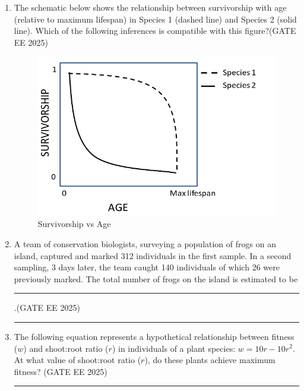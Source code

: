 \begin{enumerate}[leftmargin=*,label=\textbf{Q.\arabic*},resume]
\item The schematic below shows the relationship between survivorship with age (relative to maximum lifespan) in Species 1 (dashed line) and Species 2 (solid line). Which of the following inferences is compatible with this figure?\hfill {(GATE EE 2025)}

\begin{figure}[H]
    \centering
    \includegraphics[width=0.9\columnwidth]{figs/imageQ52.png}
    \caption{Survivorship vs Age}
    \label{fig:q52-scbematic}
\end{figure}



\item A team of conservation biologists, surveying a population of frogs on an island, captured and marked 312 individuals in the first sample. In a second sampling, 3 days later, the team caught 140 individuals of which 26 were previously marked. The total number of frogs on the island is estimated to be \rule{4cm}{0.15mm}.\hfill {(GATE EE 2025)}

\rule{4cm}{0.15mm}

\item The following equation represents a hypothetical relationship between fitness ($w$) and shoot:root ratio ($r$) in individuals of a plant species: $w = 10r-10r^2$. At what value of shoot:root ratio ($r$), do these plants achieve maximum fitness?
\hfill {(GATE EE 2025)}
\rule{4cm}{0.15mm}


\end{enumerate}
